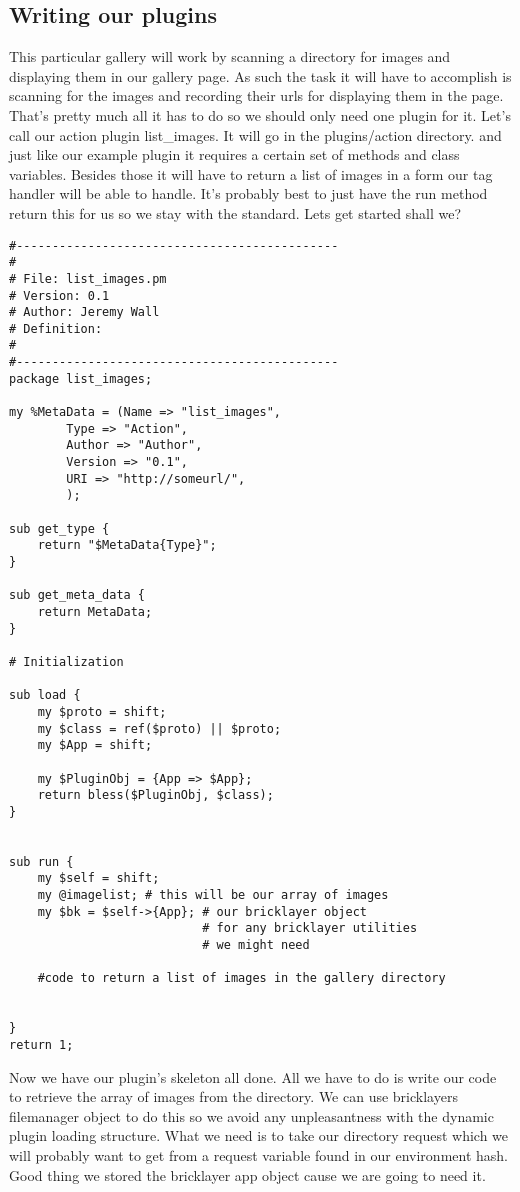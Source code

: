 \subsection{Writing our plugins}
This particular gallery will work by scanning a directory for images and displaying them in our gallery page. As such the task it will have to accomplish is scanning for the images and recording their urls for displaying them in the page. That's pretty much all it has to do so we should only need one plugin for it. Let's call our action plugin list\_images. It will go in the plugins/action directory. and just like our example plugin it requires a certain set of methods and class variables. Besides those it will have to return a list of images in a form our tag handler will be able to handle. It's probably best to just have the run method return this for us so we stay with the standard. Lets get started shall we?
\newpage
\begin{verbatim}
#---------------------------------------------
# 
# File: list_images.pm
# Version: 0.1
# Author: Jeremy Wall
# Definition: 
#
#---------------------------------------------
package list_images;

my %MetaData = (Name => "list_images",
		Type => "Action",
		Author => "Author",
		Version => "0.1",
		URI => "http://someurl/",
		);
	
sub get_type {
	return "$MetaData{Type}";
}

sub get_meta_data {
	return MetaData;
}

# Initialization

sub load {
	my $proto = shift;
	my $class = ref($proto) || $proto;
	my $App = shift; 
		
	my $PluginObj = {App => $App};	
	return bless($PluginObj, $class);	
}
	

sub run {
	my $self = shift;
	my @imagelist; # this will be our array of images
	my $bk = $self->{App}; # our bricklayer object 
	                       # for any bricklayer utilities 
	                       # we might need
	
	#code to return a list of images in the gallery directory
	
	
}
return 1;
\end{verbatim}
Now we have our plugin's skeleton all done. All we have to do is write our code to retrieve the array of images from the directory. We can use bricklayers filemanager object to do this so we avoid any unpleasantness with the dynamic plugin loading structure. What we need is to take our directory request which we will probably want to get from a request variable found in our environment hash. Good thing we stored the bricklayer app object cause we are going to need it.

